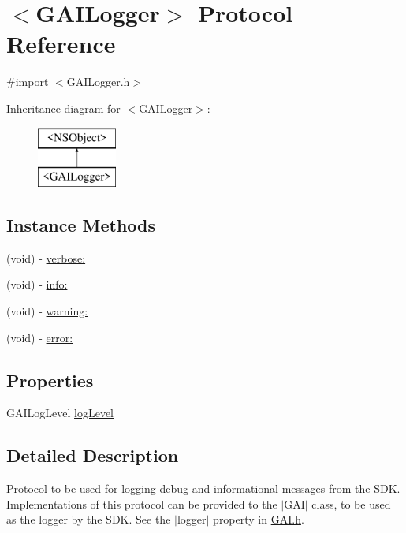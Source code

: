 \hypertarget{protocol_g_a_i_logger-p}{}\section{$<$G\+A\+I\+Logger$>$ Protocol Reference}
\label{protocol_g_a_i_logger-p}


{\ttfamily \#import $<$G\+A\+I\+Logger.\+h$>$}

Inheritance diagram for $<$G\+A\+I\+Logger$>$\+:\begin{figure}[H]
\begin{center}
\leavevmode
\includegraphics[height=2.000000cm]{protocol_g_a_i_logger-p}
\end{center}
\end{figure}
\subsection*{Instance Methods}
\begin{DoxyCompactItemize}
\item 
(void) -\/ \hyperlink{protocol_g_a_i_logger-p_a8bc28260ceafda68a72e29baecb9c0c6}{verbose\+:}
\item 
(void) -\/ \hyperlink{protocol_g_a_i_logger-p_ae558e4ce1a6d65c86abd17a11a698618}{info\+:}
\item 
(void) -\/ \hyperlink{protocol_g_a_i_logger-p_a47771f0b70be428422ea58950f3cc506}{warning\+:}
\item 
(void) -\/ \hyperlink{protocol_g_a_i_logger-p_a8a52b3a59b1aa5319f0c3b41ea5b7e4a}{error\+:}
\end{DoxyCompactItemize}
\subsection*{Properties}
\begin{DoxyCompactItemize}
\item 
G\+A\+I\+Log\+Level \hyperlink{protocol_g_a_i_logger-p_a42c0b17d9224b8a9b02281a3537cded4}{log\+Level}
\end{DoxyCompactItemize}


\subsection{Detailed Description}
Protocol to be used for logging debug and informational messages from the S\+DK. Implementations of this protocol can be provided to the $\vert$\+G\+A\+I$\vert$ class, to be used as the logger by the S\+DK. See the $\vert$logger$\vert$ property in \hyperlink{_g_a_i_8h}{G\+A\+I.\+h}. 

